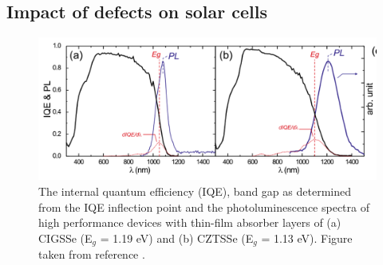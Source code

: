 \documentclass[11pt, twoside]{report}
\begin{document}
\subsection{Impact of defects on {\CZTS} solar cells}

\begin{figure}[h!]
  \centering
    \includegraphics[width=1.0\textwidth]{figures/CZTS+CIGS_PL.png}
    \caption[The internal quantum efficiency (IQE), band gap as determined from the IQE inflection point and the photoluminescence spectra of high performance devices with thin-film absorber layers of (a) CIGSSe (E$_g$ = 1.19 eV) and (b) CZTSSe (E$_g$ = 1.13 eV).]{The internal quantum efficiency (IQE), band gap as determined from the IQE inflection point and the photoluminescence spectra of high performance devices with thin-film absorber layers of (a) CIGSSe (E$_g$ = 1.19 eV) and (b) CZTSSe (E$_g$ = 1.13 eV). Figure taken from reference .}
  \label{CZTS+CIGS_PL}
\end{figure}
\end{document}
